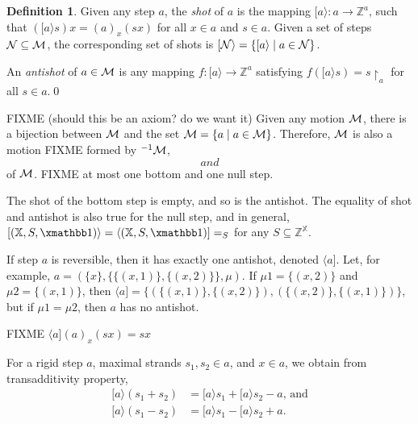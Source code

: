 \documentclass [a4paper,12pt] {article}
\theoremstyle{definition}
\newtheorem{definition}{Definition}[section]
\newcommand{\image}{}
\DeclareRobustCommand{\image}{\mathop{\textstyle\mathsmaller{\bf {Im}}}}
\newcommand{\carrier}{}
\DeclareRobustCommand{\carrier}{\mathop{\textstyle\mathsmaller{\bf {Car}}}}
\newcommand{\scope}{}
\DeclareRobustCommand{\scope}{\mathop{\textstyle\mathsmaller{\bf {Sco}}}}
\newcommand{\uniform}{}
\DeclareRobustCommand{\uniform}{\mathop{\textstyle\mathsmaller{\bf {Rep}}}}
\newcommand{\move}{}
\DeclareRobustCommand{\move}{\mathop{\textstyle\mathsmaller{\bf {Mov}}}}
\newcommand{\shift}{}
\DeclareRobustCommand{\shift}{\mathop{\textstyle\mathsmaller{\bf {Shi}}}}
\newcommand{\id}{}
\DeclareRobustCommand{\id}{\mathop{\textstyle{\rm {id}}}}
\begin{document}
\begin {definition}
  Given any step $a$, the {\em shot}\/ of $a$ is the mapping
  $[a\rangle\!: \scope{a} \rightarrow {\mathbb Z}^{\carrier{a}}$, such
    that $({[a\rangle}s)x = (\move{a})_x(sx)$ for all $x \in
      \carrier{a}$ and $s \in \scope{a}$.  Given a set of steps ${\cal
        N} \subseteq {\cal M}$, the corresponding set of shots is
      $[{\cal N}\rangle = \{[a\rangle \;|\; a \in {\cal N}\}$.

  An {\em antishot}\/ of $a \in {\cal M}$ is any mapping
  $f\!:\image{[a\rangle} \rightarrow {\mathbb Z}^{\carrier{a}}$
    satisfying $f({[a\rangle}s) = s{\restriction}_{\carrier{a}}$ for
      all $s \in \scope{a}$.\qed
\end {definition}

FIXME (should this be an axiom? do we want it) Given any motion ${\cal
  M}$, there is a bijection between ${\cal M}$ and the set
$\uniform{{\cal M}} = \{\uniform{a} \;|\; a \in {\cal M}\}$.
Therefore, $\uniform{{\cal M}}$ is also a motion FIXME formed by
$\uniform^{-1}\carrier{{\cal M}}$, $\scope$ and $\move$ of ${\cal M}$.
FIXME at most one bottom and one null step.

The shot of the bottom step is empty, and so is the antishot.  The
equality of shot and antishot is also true for the null step, and in
general, $[({\mathbb X}, S, {\xmathbb 1})\rangle = \langle({\mathbb
    X}, S, {\xmathbb 1})] = \id_S$ for any $S \subseteq {\mathbb
  Z}^{\mathbb X}$.

If step $a$ is reversible, then it has exactly one antishot, denoted
$\langle a]$.  Let, for example, $\uniform{a} = (\{x\}, \{\{(x, 1)\},
    \{(x, 2)\}\}, \mu)$.  If $\mu 1 = \{(x, 2)\}$ and $\mu 2 = \{(x,
    1)\}$, then $\langle a] = \{(\{(x, 1)\}, \{(x, 2)\}), (\{(x, 2)\},
  \{(x, 1)\})\}$, but if $\mu 1 = \mu 2$, then $a$ has no antishot.

FIXME $\langle a](\move{a})_x(sx) = sx$

For a rigid step $a$, maximal strands $s_1, s_2 \in \scope{a}$, and $x
\in \carrier{a}$, we obtain from transadditivity property,
%
\begin {align*}
  {[a\rangle}(s_1 + s_2) &= {[a\rangle}s_1 +
      {[a\rangle}s_2 - \shift{a}\textrm{, and}\\
  {[a\rangle}(s_1 - s_2) &= {[a\rangle}s_1 -
      {[a\rangle}s_2 + \shift{a}.
\end {align*}
\end{document}
